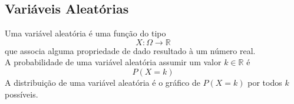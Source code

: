 \documentclass{article}
\begin{document}
\subsection{Variáveis Aleatórias}
Uma variável aleatória é uma função do tipo
\[ X: \Omega \to \mathbb{R} \]
que associa alguma propriedade de dado resultado à um número real. \\[5pt]
A probabilidade de uma variável aleatória assumir um valor $k \in \mathbb{R}$ é
\[ P(X = k) \]
A distribuição de uma variável aleatória é o gráfico de $P(X = k)$ por todos $k$ possíveis.
\end{document}
